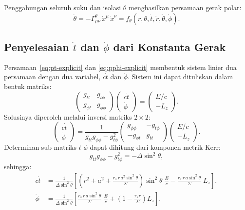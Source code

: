 Penggabungan seluruh suku dan isolasi $\ddot{\theta}$
menghasilkan persamaan gerak polar:
\begin{equation}
    \boxed{\ddot{\theta} = -\Gamma^\theta_{\mu\nu}\,\dot{x}^\mu\,\dot{x}^\nu
    = f_\theta(r, \theta, \dot{t}, \dot{r}, \dot{\theta}, \dot{\phi}).}
    \label{eq:geodesic-theta}
\end{equation}


\subsection{Penyelesaian $\dot{t}$ dan $\dot{\phi}$ dari Konstanta Gerak}
\label{subsec:solve-tdot-phidot}

Persamaan~\eqref{eq:pt-explicit} dan \eqref{eq:pphi-explicit}
membentuk sistem linier dua persamaan dengan dua variabel,
$c\dot{t}$ dan $\dot{\phi}$.
Sistem ini dapat dituliskan dalam bentuk matriks:
\begin{equation}
    \begin{pmatrix} g_{tt} & g_{t\phi} \\ g_{\phi t} & g_{\phi\phi} \end{pmatrix}
    \begin{pmatrix} c\dot{t} \\ \dot{\phi} \end{pmatrix}
    =
    \begin{pmatrix} E/c \\ -L_z \end{pmatrix}.
    \label{eq:system-tdot-phidot}
\end{equation}
Solusinya diperoleh melalui inversi matriks $2 \times 2$:
\begin{equation}
    \begin{pmatrix} c\dot{t} \\ \dot{\phi} \end{pmatrix}
    = \frac{1}{g_{tt}g_{\phi\phi} - g_{t\phi}^2}
    \begin{pmatrix} g_{\phi\phi} & -g_{t\phi} \\ -g_{\phi t} & g_{tt} \end{pmatrix}
    \begin{pmatrix} E/c \\ -L_z \end{pmatrix}.
    \label{eq:solution-tdot-phidot}
\end{equation}
Determinan sub-matriks $t$-$\phi$ dapat dihitung dari komponen metrik Kerr:
\begin{equation}
    g_{tt}g_{\phi\phi} - g_{t\phi}^2 = -\Delta\sin^2\!\theta,
    \label{eq:det-tphi}
\end{equation}
sehingga:
\begin{align}
    c\dot{t} &= \frac{1}{\Delta\sin^2\!\theta}
    \left[
        \left(r^2 + a^2 + \frac{r_s\, r\, a^2\sin^2\!\theta}{\Sigma}\right)
        \sin^2\!\theta\;\frac{E}{c}
        - \frac{r_s\, r\, a\sin^2\!\theta}{\Sigma}\; L_z
    \right],
    \label{eq:tdot-explicit} \\[8pt]
    \dot{\phi} &= \frac{1}{\Delta\sin^2\!\theta}
    \left[
        \frac{r_s\, r\, a\sin^2\!\theta}{\Sigma}\;\frac{E}{c}
        + \left(1 - \frac{r_s r}{\Sigma}\right) L_z
    \right].
    \label{eq:phidot-explicit}
\end{align}

